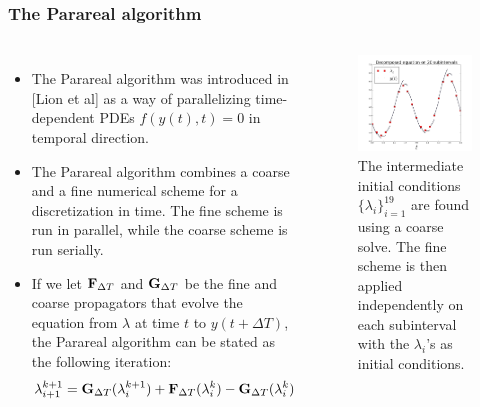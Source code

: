 \documentclass[9pt]{beamer}
\begin{document}
\begin{frame}
\frametitle{The Parareal algorithm}
\begin{columns}
\begin{itemize}
\item{The Parareal algorithm was introduced in [Lion et al] as a way of parallelizing time-dependent PDEs $f(y(t),t)=0$ in temporal direction.}
\item{The Parareal algorithm combines a coarse and a fine numerical scheme for a discretization in time. The fine scheme is run in parallel, while the coarse scheme is run serially.}
\item{If we let $\bold{F}_{\Delta T}$ and $\bold{G}_{\Delta T}$ be the fine and coarse propagators that evolve the equation from $\lambda$ at time $t$ to $y(t+\Delta T)$, the Parareal algorithm can be stated as the following iteration:
\begin{align*}
\lambda_{i+1}^{k+1} = \bold{G}_{\Delta T}(\lambda_{i}^{k+1})+\bold{F}_{\Delta T}(\lambda_{i}^{k})-\bold{G}_{\Delta T}(\lambda_{i}^{k})
\end{align*}}

\end{itemize}
\begin{figure}[!h]
\includegraphics[scale=0.2]{parareal.png}
\caption{{\small 
The intermediate initial conditions $\{\lambda_i\}_{i=1}^{19}$ are found using a coarse solve. The fine scheme is then applied independently on each subinterval with the $\lambda_i$'s as initial conditions.
}}
\end{figure}
\end{columns}

\end{frame}
\end{document}
